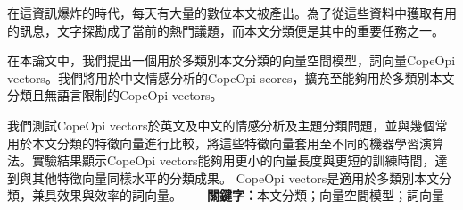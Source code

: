 \begin{abstractzh}
\par 在這資訊爆炸的時代，每天有大量的數位本文被產出。為了從這些資料中獲取有用的訊息，文字探勘成了當前的熱門議題，而本文分類便是其中的重要任務之一。
\par 在本論文中，我們提出一個用於多類別本文分類的向量空間模型，詞向量CopeOpi vectors。我們將用於中文情感分析的CopeOpi scores，擴充至能夠用於多類別本文分類且無語言限制的CopeOpi vectors。
\par 我們測試CopeOpi vectors於英文及中文的情感分析及主題分類問題，並與幾個常用於本文分類的特徵向量進行比較，將這些特徵向量套用至不同的機器學習演算法。實驗結果顯示CopeOpi vectors能夠用更小的向量長度與更短的訓練時間，達到與其他特徵向量同樣水平的分類成果。 CopeOpi vectors是適用於多類別本文分類，兼具效果與效率的詞向量。
~\newline
~\newline
\textbf{關鍵字：}本文分類；向量空間模型；詞向量
\end{abstractzh}
